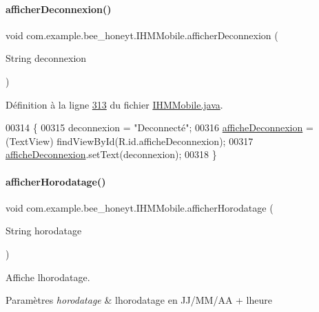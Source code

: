\paragraph{\texorpdfstring{afficher\+Deconnexion()}{afficherDeconnexion()}}
{\footnotesize\ttfamily void com.\+example.\+bee\+\_\+honeyt.\+I\+H\+M\+Mobile.\+afficher\+Deconnexion (\begin{DoxyParamCaption}\item[{String}]{deconnexion }\end{DoxyParamCaption})}



Définition à la ligne \hyperlink{_i_h_m_mobile_8java_source_l00313}{313} du fichier \hyperlink{_i_h_m_mobile_8java_source}{I\+H\+M\+Mobile.\+java}.


\begin{DoxyCode}
00314     \{
00315         deconnexion = \textcolor{stringliteral}{"Deconnecté"};
00316         \hyperlink{classcom_1_1example_1_1bee__honeyt_1_1_i_h_m_mobile_a6387ccc4e8483220e821e9e88f7d3964}{afficheDeconnexion} = (TextView) findViewById(R.id.afficheDeconnexion);
00317         \hyperlink{classcom_1_1example_1_1bee__honeyt_1_1_i_h_m_mobile_a6387ccc4e8483220e821e9e88f7d3964}{afficheDeconnexion}.setText(deconnexion);
00318     \}
\end{DoxyCode}
\mbox{\label{classcom_1_1example_1_1bee__honeyt_1_1_i_h_m_mobile_ae1a488c4774eea0b794257f576ab932d}} 
\paragraph{\texorpdfstring{afficher\+Horodatage()}{afficherHorodatage()}}
{\footnotesize\ttfamily void com.\+example.\+bee\+\_\+honeyt.\+I\+H\+M\+Mobile.\+afficher\+Horodatage (\begin{DoxyParamCaption}\item[{String}]{horodatage }\end{DoxyParamCaption})}



Affiche l\textquotesingle{}horodatage. 


\begin{DoxyParams}{Paramètres}
{\em horodatage} & l\textquotesingle{}horodatage en J\+J/\+M\+M/\+AA + l\textquotesingle{}heure \\
\hline
\end{DoxyParams}


